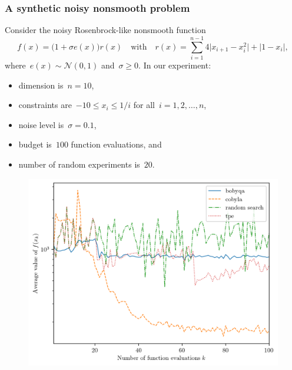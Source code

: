\documentclass[usenames,dvipsnames,10pt]{beamer}
\newcommand{\abs}[2][]{#1\lvert#2#1\rvert}
\begin{document}
\begin{frame}[c,allowframebreaks]
    \frametitle{A synthetic noisy nonsmooth problem}

    Consider the \alert{noisy Rosenbrock-like nonsmooth} function
    $$f(x) = \big(1 + \sigma e(x)\big) r(x) \quad \text{with} \quad r(x) = \sum_{i = 1}^{n - 1} 4 \abs[\big]{x_{i + 1} - x_i^2} + \abs{1 - x_i},$$
    where~$e(x) \sim \mathcal{N}(0, 1)$ and~$\sigma \ge 0$.
    In our experiment:
    \begin{itemize}
        \item dimension is~$n = 10$,
        \item constraints are~$-10 \le x_i \le 1 / i$ for all~$i = 1, 2, \dots, n$,
        \item noise level is~\alert{$\sigma = 0.1$},
        \item budget is~\alert{$100$} function evaluations, and
        \item number of random experiments is~$20$.
    \end{itemize}

    \framebreak

    \begin{figure}
        \centering
        \includegraphics[width=.85\textwidth]{comp.png}
    \end{figure}
\end{frame}
\end{document}
